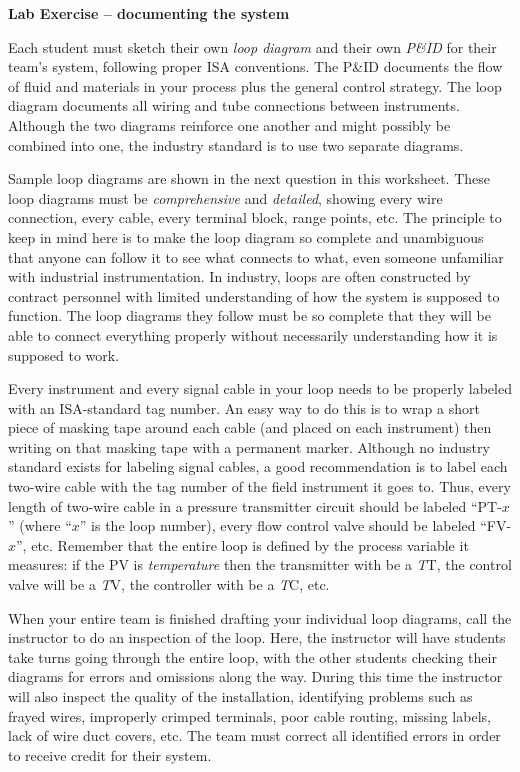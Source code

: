 \noindent
{\bf Lab Exercise -- documenting the system}

\vskip 5pt

Each student must sketch their own {\it loop diagram} and their own {\it P\&ID} for their team's system, following proper ISA conventions.  The P\&ID documents the flow of fluid and materials in your process plus the general control strategy.  The loop diagram documents all wiring and tube connections between instruments.  Although the two diagrams reinforce one another and might possibly be combined into one, the industry standard is to use two separate diagrams.

Sample loop diagrams are shown in the next question in this worksheet.  These loop diagrams must be {\it comprehensive} and {\it detailed}, showing every wire connection, every cable, every terminal block, range points, etc.  The principle to keep in mind here is to make the loop diagram so complete and unambiguous that anyone can follow it to see what connects to what, even someone unfamiliar with industrial instrumentation.  In industry, loops are often constructed by contract personnel with limited understanding of how the system is supposed to function.  The loop diagrams they follow must be so complete that they will be able to connect everything properly without necessarily understanding how it is supposed to work.

Every instrument and every signal cable in your loop needs to be properly labeled with an ISA-standard tag number.  An easy way to do this is to wrap a short piece of masking tape around each cable (and placed on each instrument) then writing on that masking tape with a permanent marker.  Although no industry standard exists for labeling signal cables, a good recommendation is to label each two-wire cable with the tag number of the field instrument it goes to.  Thus, every length of two-wire cable in a pressure transmitter circuit should be labeled ``PT-$x$'' (where ``$x$'' is the loop number), every flow control valve should be labeled ``FV-$x$'', etc.  Remember that the entire loop is defined by the process variable it measures: if the PV is {\it temperature} then the transmitter with be a {\it T}T, the control valve will be a {\it T}V, the controller with be a {\it T}C, etc.

When your entire team is finished drafting your individual loop diagrams, call the instructor to do an inspection of the loop.  Here, the instructor will have students take turns going through the entire loop, with the other students checking their diagrams for errors and omissions along the way.  During this time the instructor will also inspect the quality of the installation, identifying problems such as frayed wires, improperly crimped terminals, poor cable routing, missing labels, lack of wire duct covers, etc.  The team must correct all identified errors in order to receive credit for their system.  

